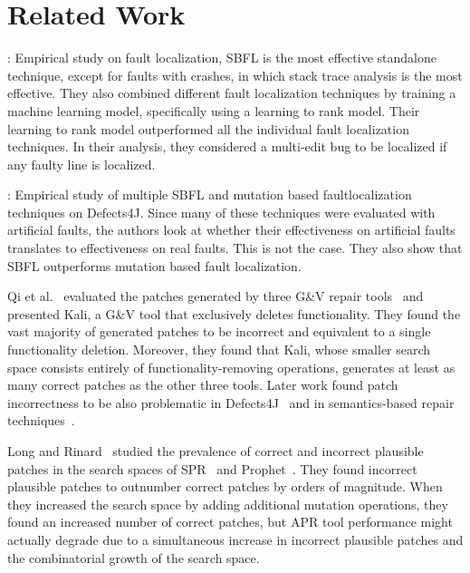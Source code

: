 \documentclass[sigconf, timestamp-false, anonymous=true]{acmart}
\begin{document}
\section{Related Work}

\cite{zou2019empirical}: Empirical study on fault localization, SBFL is the most effective standalone 
technique, except for faults with crashes, in which stack trace analysis is the most effective. They 
also combined different fault localization techniques by training a machine learning model, 
specifically using a learning to rank model. Their learning to rank model outperformed all the 
individual fault localization techniques. In their analysis, they considered a multi-edit bug to be 
localized if any faulty line is localized.

\cite{pearson2017evaluating}: Empirical study of multiple SBFL and mutation based faultlocalization 
techniques on Defects4J. Since many of these techniques were evaluated with artificial faults, the 
authors look at whether their effectiveness on artificial faults translates to effectiveness on real 
faults. This is not the case. They also show that SBFL outperforms mutation based fault localization.

Qi et al.~\cite{patch-correctness} evaluated the patches generated 
by three G\&V repair tools~\cite{genprog, ae, rsrepair} and presented 
Kali, a G\&V tool that exclusively deletes functionality. They found the 
vast majority of generated patches to be incorrect and equivalent to 
a single functionality deletion. Moreover, they found that Kali, whose 
smaller search space consists entirely of functionality-removing 
operations, generates at least as many correct patches as the 
other three tools. Later work found patch incorrectness to be 
also problematic in Defects4J~\cite{d4j-eval} and in semantics-based 
repair techniques~\cite{Le2018}.

Long and Rinard~\cite{long-search-spaces} studied the prevalence of 
correct and incorrect plausible patches in the search spaces of SPR~\cite{spr} 
and Prophet~\cite{prophet}. They found incorrect plausible patches to outnumber 
correct patches by orders of magnitude. When they increased the search space 
by adding additional mutation operations, they found an increased number of 
correct patches, but APR tool performance might actually degrade due to a 
simultaneous increase in incorrect plausible patches and the combinatorial 
growth of the search space.
\end{document}
